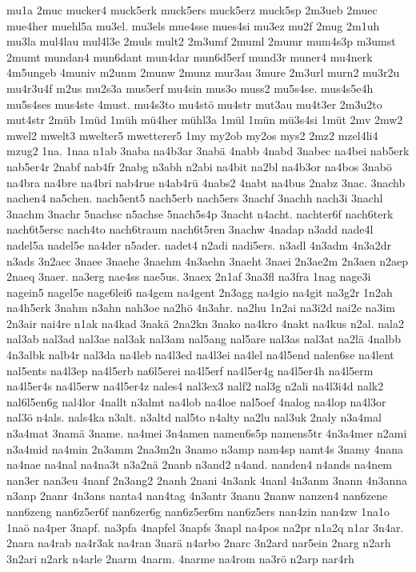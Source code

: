 {mu1a
2muc
mucker4
muck5erk
muck5ers
muck5erz
muck5sp
2m3ueb
2muec
mue4her
muehl5a
mu3el.
mu3els
mue4sse
mues4si
mu3ez
mu2f
2mug
2m1uh
mu3la
mul4lau
mul4l3e
2muls
mult2
2m3umf
2muml
2mumr
mum4s3p
m3umst
2mumt
mundan4
mun6dant
mun4dar
mun6d5erf
mund3r
muner4
mu4nerk
4m5ungeb
4muniv
m2unm
2munw
2munz
mur3au
3mure
2m3url
murn2
mu3r2u
mu4r3u4f
m2us
mu2s3a
mus5erf
mu4sin
mus3o
muss2
mu5s4se.
mus4s5e4h
mu5s4ses
mus4ste
4must.
mu4s3to
mu4stö
mu4str
mut3au
mu4t3er
2m3u2to
mut4str
2müb
1müd
1müh
mü4her
mühl3a
1mül
1mün
mü3s4si
1müt
2mv
2mw2
mwel2
mwelt3
mwelter5
mwetterer5
1my
my2ob
my2os
mys2
2mz2
mzel4li4
mzug2
1na.
1naa
n1ab
3naba
na4b3ar
3nabä
4nabb
4nabd
3nabec
na4bei
nab5erk
nab5er4r
2nabf
nab4fr
2nabg
n3abh
n2abi
na4bit
na2bl
na4b3or
na4bos
3nabö
na4bra
na4bre
na4bri
nab4rue
n4ab4rü
4nabs2
4nabt
na4bus
2nabz
3nac.
3nachb
nachen4
na5chen.
nach5ent5
nach5erb
nach5ers
3nachf
3nachh
nach3i
3nachl
3nachm
3nachr
5nachsc
n5achse
5nach5s4p
3nacht
n4acht.
nachter6f
nach6terk
nach6t5ersc
nach4to
nach6traum
nach6t5ren
3nachw
4nadap
n3add
nade4l
nadel5a
nadel5e
na4der
n5ader.
nadet4
n2adi
nadi5ers.
n3adl
4n3adm
4n3a2dr
n3ads
3n2aec
3naee
3naehe
3naehm
4n3aehn
3naeht
3naei
2n3ae2m
2n3aen
n2aep
2naeq
3naer.
na3erg
nae4ss
nae5us.
3naex
2n1af
3na3fl
na3fra
1nag
nage3i
nagein5
nagel5e
nage6lei6
na4gem
na4gent
2n3agg
na4gio
na4git
na3g2r
1n2ah
na4h5erk
3nahm
n3ahn
nah3oe
na2hö
4n3ahr.
na2hu
1n2ai
na3i2d
nai2e
na3im
2n3air
nai4re
n1ak
na4kad
3nakä
2na2kn
3nako
na4kro
4nakt
na4kus
n2al.
nala2
nal3ab
nal3ad
nal3ae
nal3ak
nal3am
nal5ang
nal5are
nal3as
nal3at
na2lä
4nalbb
4n3albk
nalb4r
nal3da
na4leb
na4l3ed
na4l3ei
na4lel
na4l5end
nalen6se
na4lent
nal5ents
na4l3ep
na4l5erb
na6l5erei
na4l5erf
na4l5er4g
na4l5er4h
na4l5erm
na4l5er4s
na4l5erw
na4l5er4z
nales4
nal3ex3
nalf2
nal3g
n2ali
na4l3i4d
nalk2
nal6l5en6g
nal4lor
4nallt
n3almt
na4lob
na4loe
nal5oef
4nalog
na4lop
na4l3or
nal3ö
n4als.
nals4ka
n3alt.
n3altd
nal5to
n4alty
na2lu
nal3uk
2naly
n3a4mal
n3a4mat
3namä
3name.
na4mei
3n4amen
namen6s5p
namens5tr
4n3a4mer
n2ami
n3a4mid
na4min
2n3amm
2na3m2n
3namo
n3amp
nam4sp
namt4s
3namy
4nana
na4nae
na4nal
na4na3t
n3a2nä
2nanb
n3and2
n4and.
nanden4
n4ands
na4nem
nan3er
nan3eu
4nanf
2n3ang2
2nanh
2nani
4n3ank
4nanl
4n3anm
3nann
4n3anna
n3anp
2nanr
4n3ans
nanta4
nan4tag
4n3antr
3nanu
2nanw
nanzen4
nan6zene
nan6zeng
nan6z5er6f
nan6zer6g
nan6z5er6m
nan6z5ers
nan4zin
nan4zw
1na1o
1naö
na4per
3napf.
na3pfa
4napfel
3napfs
3napl
na4pos
na2pr
n1a2q
n1ar
3n4ar.
2nara
na4rab
na4r3ak
na4ran
3narä
n4arbo
2narc
3n2ard
nar5ein
2narg
n2arh
3n2ari
n2ark
n4arle
2narm
4narm.
4narme
na4rom
na3rö
n2arp
nar4rh
}

